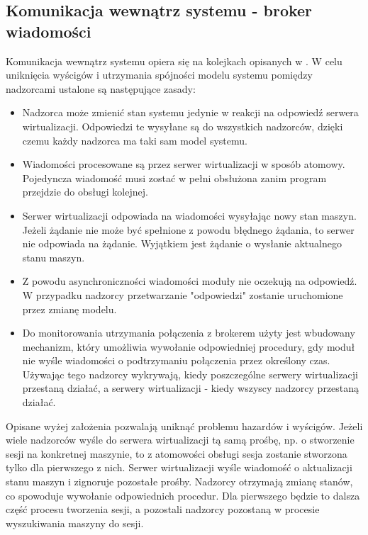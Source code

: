 \documentclass[../deliverable-two.tex]{subfiles}
\begin{document}
\subsection{Komunikacja wewnątrz systemu - broker wiadomości}
\label{communication:broker}

Komunikacja wewnątrz systemu opiera się na kolejkach opisanych w . W celu uniknięcia wyścigów i utrzymania spójności modelu systemu pomiędzy nadzorcami ustalone są następujące zasady:
\begin{itemize}
    \item Nadzorca może zmienić stan systemu jedynie w reakcji na odpowiedź serwera wirtualizacji. Odpowiedzi te wysyłane są do wszystkich nadzorców, dzięki czemu każdy nadzorca ma taki sam model systemu.
    \item Wiadomości procesowane są przez serwer wirtualizacji w sposób atomowy. Pojedyncza wiadomość musi zostać w pełni obsłużona zanim program przejdzie do obsługi kolejnej.
    \item Serwer wirtualizacji odpowiada na wiadomości wysyłając nowy stan maszyn. Jeżeli żądanie nie może być spełnione z powodu błędnego żądania, to serwer nie odpowiada na żądanie. Wyjątkiem jest żądanie o wysłanie aktualnego stanu maszyn.
    \item Z powodu asynchroniczności wiadomości moduły nie oczekują na odpowiedź. W przypadku nadzorcy przetwarzanie "odpowiedzi" zostanie uruchomione przez zmianę modelu.
    \item Do monitorowania utrzymania połączenia z brokerem użyty jest wbudowany mechanizm, który umożliwia wywołanie odpowiedniej procedury, gdy moduł nie wyśle wiadomości o podtrzymaniu połączenia przez określony czas. Używając tego nadzorcy wykrywają, kiedy poszczególne serwery wirtualizacji przestaną działać, a serwery wirtualizacji - kiedy wszyscy nadzorcy przestaną działać.
\end{itemize}

Opisane wyżej założenia pozwalają uniknąć problemu hazardów i wyścigów. Jeżeli wiele nadzorców wyśle do serwera wirtualizacji tą samą prośbę, np. o stworzenie sesji na konkretnej maszynie, to z atomowości obsługi sesja zostanie stworzona tylko dla pierwszego z nich. Serwer wirtualizacji wyśle wiadomość o aktualizacji stanu maszyn i zignoruje pozostałe prośby. Nadzorcy otrzymają zmianę stanów, co spowoduje wywołanie odpowiednich procedur. Dla pierwszego będzie to dalsza część procesu tworzenia sesji, a pozostali nadzorcy pozostaną w procesie wyszukiwania maszyny do sesji.
\end{document}
